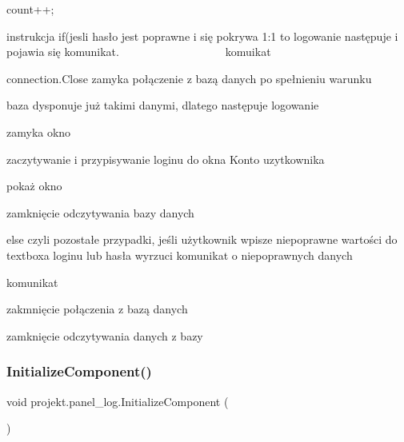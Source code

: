 count++;

instrukcja if(jesli hasło jest poprawne i się pokrywa 1\+:1 to logowanie następuje i pojawia się komunikat. ~\newline
~\newline
~\newline
~\newline
~\newline
~\newline
~\newline
~\newline
~\newline
~\newline
~\newline
 komuikat

connection.\+Close zamyka połączenie z bazą danych po spełnieniu warunku

baza dysponuje już takimi danymi, dlatego następuje logowanie

zamyka okno

zaczytywanie i przypisywanie loginu do okna Konto uzytkownika

pokaż okno

zamknięcie odczytywania bazy danych

else czyli pozostałe przypadki, jeśli użytkownik wpisze niepoprawne wartości do textboxa loginu lub hasła wyrzuci komunikat o niepoprawnych danych

komunikat

zakmnięcie połączenia z bazą danych

zamknięcie odczytywania danych z bazy \mbox{\label{classprojekt_1_1panel__log_a4e106ef7dc0b75cb61bb7018dff7e746}} 
\subsubsection{\texorpdfstring{Initialize\+Component()}{InitializeComponent()}\hspace{0.1cm}{\footnotesize\ttfamily [1/9]}}
{\footnotesize\ttfamily void projekt.\+panel\+\_\+log.\+Initialize\+Component (\begin{DoxyParamCaption}{ }\end{DoxyParamCaption})\hspace{0.3cm}{\ttfamily [inline]}}



